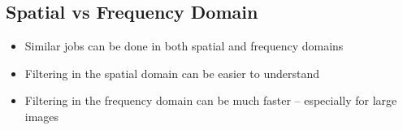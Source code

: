 \subsection*{Spatial vs Frequency Domain}

\begin{itemize}
  \item Similar jobs can be done in both spatial and frequency domains
  \item Filtering in the spatial domain can be easier to understand
  \item Filtering in the frequency domain can be much faster – especially for large images
\end{itemize}
